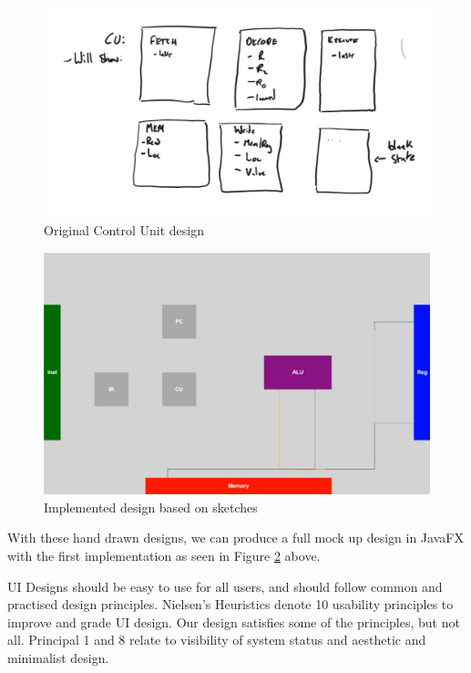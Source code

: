 \begin{figure}[H]
    \centering
    \includegraphics[width=\linewidth]{dissertation/DATA/control_unit.jpg}
    \caption{Original Control Unit design}
    \label{fig:early_cu_design}
\end{figure}

\begin{figure}[H]
    \centering
    \includegraphics[width=0.9\linewidth]{dissertation/DATA/first_design_implementation.jpg}
    \caption{Implemented design based on sketches}
    \label{fig:origina_implemented_design}
\end{figure}

With these hand drawn designs, we can produce a full mock up design in JavaFX with the first implementation as seen in Figure \ref{fig:origina_implemented_design} above.

UI Designs should be easy to use for all users, and should follow common and practised design principles. Nielsen's Heuristics \cite{nielsen_2020_10} denote 10 usability principles to improve and grade UI design. Our design satisfies some of the principles, but not all. Principal 1 and 8 relate to visibility of system status and aesthetic and minimalist design. 

